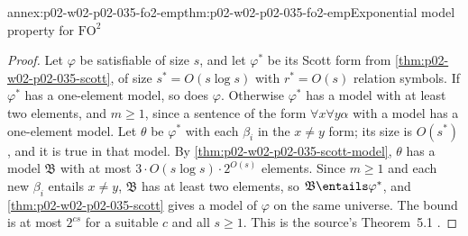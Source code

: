 \begin{annexitem}{annex:p02-w02-p02-035-fo2-emp}{thm:p02-w02-p02-035-fo2-emp}{Exponential model property for \(\mathrm{FO}^2\)}
\begin{proof}
Let \(\varphi\) be satisfiable of size \(s\), and let \(\varphi^{*}\) be its
Scott form from \cref{thm:p02-w02-p02-035-scott}, of size \(s^{*}=O(s\log s)\)
with \(r^{*}=O(s)\) relation symbols.  If \(\varphi^{*}\) has a one-element
model, so does \(\varphi\).  Otherwise \(\varphi^{*}\) has a model with at
least two elements, and \(m\geq1\), since a sentence of the form
\(\forall x\forall y\alpha\) with a model has a one-element model.  Let
\(\theta\) be \(\varphi^{*}\) with each \(\beta_i\) in the \(x\neq y\) form;
its size is \(O(s^{*})\), and it is true in that model.  By
\cref{thm:p02-w02-p02-035-scott-model}, \(\theta\) has a model \(\mathfrak B\)
with at most \(3\cdot O(s\log s)\cdot2^{O(s)}\) elements.  Since \(m\geq1\)
and each new \(\beta_i\) entails \(x\neq y\), \(\mathfrak B\) has at least two
elements, so \(\mathfrak B\entails\varphi^{*}\), and
\cref{thm:p02-w02-p02-035-scott} gives a model of \(\varphi\) on the same
universe.  The bound is at most \(2^{cs}\) for a suitable \(c\) and all
\(s\geq1\).  This is the source's Theorem~5.1
\cite[thm.~5.1]{GradelKolaitisVardi1997}.
\end{proof}
\end{annexitem}

